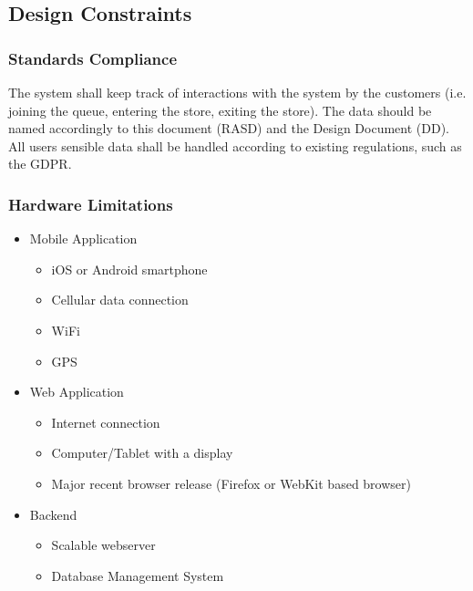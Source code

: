 \subsection{Design Constraints}
\subsubsection{Standards Compliance}
The system shall keep track of interactions with the system by the customers (i.e. joining the queue, entering the store, exiting the store).
The data should be named accordingly to this document (RASD) and the Design Document (DD).
All users sensible data shall be handled according to existing regulations, such as the GDPR.

\subsubsection{Hardware Limitations}
\begin{itemize}
    \item Mobile Application
    \begin{itemize}
        \item iOS or Android smartphone
        \item Cellular data connection
        \item WiFi
        \item GPS
    \end{itemize}
    \item Web Application
    \begin{itemize}
        \item Internet connection
        \item Computer/Tablet with a display
        \item Major recent browser release (Firefox or WebKit based browser)
    \end{itemize}
    \item Backend
    \begin{itemize}
        \item Scalable webserver
        \item Database Management System
    \end{itemize}
\end{itemize}

